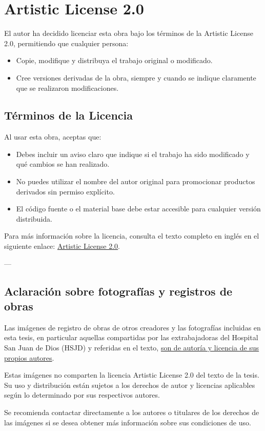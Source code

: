 \section*{Artistic License 2.0}

El autor ha decidido licenciar esta obra bajo los términos de la Artistic License 2.0, permitiendo que cualquier persona:
\begin{itemize}
    \item Copie, modifique y distribuya el trabajo original o modificado.
    \item Cree versiones derivadas de la obra, siempre y cuando se indique claramente que se realizaron modificaciones.
\end{itemize}

\subsection*{Términos de la Licencia}

Al usar esta obra, aceptas que:

\begin{itemize}
    \item Debes incluir un aviso claro que indique si el trabajo ha sido modificado y qué cambios se han realizado.
    \item No puedes utilizar el nombre del autor original para promocionar productos derivados sin permiso explícito.
    \item El código fuente o el material base debe estar accesible para cualquier versión distribuida.
\end{itemize}

Para más información sobre la licencia, consulta el texto completo en inglés en el siguiente enlace: \href{https://opensource.org/licenses/Artistic-2.0}{Artistic License 2.0}.

---

\subsection*{Aclaración sobre fotografías y registros de obras}

Las imágenes de registro de obras de otros creadores y las fotografías incluidas en esta tesis, en particular aquellas compartidas por las extrabajadoras del Hospital San Juan de Dios (HSJD) y referidas en el texto, \underline{son de autoría y licencia de sus propios autores}.

Estas imágenes no comparten la licencia Artistic License 2.0 del texto de la tesis. Su uso y distribución están sujetos a los derechos de autor y licencias aplicables según lo determinado por sus respectivos autores.

Se recomienda contactar directamente a los autores o titulares de los derechos de las imágenes si se desea obtener más información sobre sus condiciones de uso.
